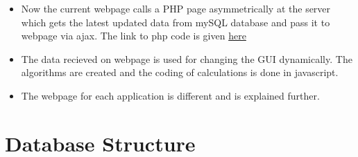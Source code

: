 \documentclass[a4paper,12pt,oneside]{book}
\begin{document}
\begin{itemize}
  \item Now the current webpage calls a PHP page asymmetrically at the server which gets the latest updated data from mySQL database and pass it to webpage via ajax. The link to php code is given \href{https://github.com/eYSIP-2016/Wiced-Sense/blob/master/Codes/wiced%20web/controller/new.php}{here}
  
  \item The data recieved on webpage is used for changing the GUI dynamically. The algorithms are created and the coding of calculations is done in javascript.
  
  \item The webpage for each application is different and is explained further.
\end{itemize}

\newpage
\section{Database Structure}
\end{document}
